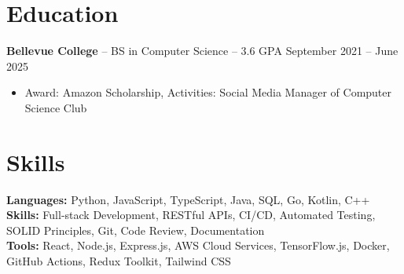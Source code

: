 \documentclass[11pt]{article}       %
\begin{document}

\vspace{-18.5pt}

\section*{Education}
\textbf{Bellevue College} -- BS in Computer Science -- 3.6 GPA \hfill September 2021 -- June 2025\\
\vspace{-9pt}
\begin{itemize}
  \item Award: Amazon Scholarship, Activities: Social Media Manager of Computer Science Club
\end{itemize}

\vspace{-18.5pt}

\section*{Skills}
\textbf{Languages:} Python, JavaScript, TypeScript, Java, SQL, Go, Kotlin, C++\\
\textbf{Skills:} Full-stack Development, RESTful APIs, CI/CD, Automated Testing, SOLID Principles, Git, Code Review, Documentation\\
\textbf{Tools:} React, Node.js, Express.js, AWS Cloud Services, TensorFlow.js, Docker, GitHub Actions, Redux Toolkit, Tailwind CSS\\

\vspace{-6.5pt}
\end{document}
